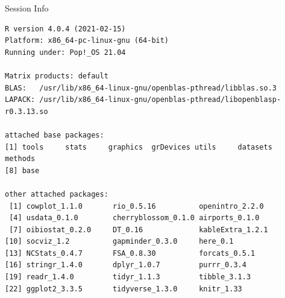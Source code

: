 \documentclass[10pt,handout]{beamer}\usepackage[]{graphicx}\usepackage[]{color}
\makeatletter
\newenvironment{kframe}{%
 \def\at@end@of@kframe{}%
 \ifinner\ifhmode%
  \def\at@end@of@kframe{\end{minipage}}%
  \begin{minipage}{\columnwidth}%
 \fi\fi%
 \def\FrameCommand##1{\hskip\@totalleftmargin \hskip-\fboxsep
 \colorbox{shadecolor}{##1}\hskip-\fboxsep
     \hskip-\linewidth \hskip-\@totalleftmargin \hskip\columnwidth}%
 \MakeFramed {\advance\hsize-\width
   \@totalleftmargin\z@ \linewidth\hsize
   \@setminipage}}%
 {\par\unskip\endMakeFramed%
 \at@end@of@kframe}
\newenvironment{knitrout}{}{} %
\makeatother
\begin{document}
	\begin{frame}[fragile]{Session Info}
	\tiny
	
\begin{knitrout}\tiny
{}\color{fgcolor}\begin{kframe}
\begin{verbatim}
R version 4.0.4 (2021-02-15)
Platform: x86_64-pc-linux-gnu (64-bit)
Running under: Pop!_OS 21.04

Matrix products: default
BLAS:   /usr/lib/x86_64-linux-gnu/openblas-pthread/libblas.so.3
LAPACK: /usr/lib/x86_64-linux-gnu/openblas-pthread/libopenblasp-r0.3.13.so

attached base packages:
[1] tools     stats     graphics  grDevices utils     datasets  methods  
[8] base     

other attached packages:
 [1] cowplot_1.1.0       rio_0.5.16          openintro_2.2.0    
 [4] usdata_0.1.0        cherryblossom_0.1.0 airports_0.1.0     
 [7] oibiostat_0.2.0     DT_0.16             kableExtra_1.2.1   
[10] socviz_1.2          gapminder_0.3.0     here_0.1           
[13] NCStats_0.4.7       FSA_0.8.30          forcats_0.5.1      
[16] stringr_1.4.0       dplyr_1.0.7         purrr_0.3.4        
[19] readr_1.4.0         tidyr_1.1.3         tibble_3.1.3       
[22] ggplot2_3.3.5       tidyverse_1.3.0     knitr_1.33         


\end{verbatim}
\end{kframe}
\end{knitrout}
\end{frame}
\end{document}
